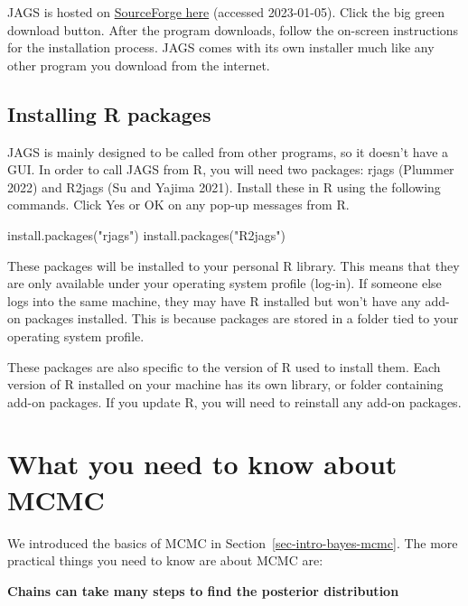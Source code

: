 \documentclass[
  13,
  letterpaper,
]{report}
\newenvironment{Shaded}{\begin{snugshade}}{\end{snugshade}}
\newcommand{\FunctionTok}[1]{\textcolor[rgb]{0.28,0.35,0.67}{#1}}
\newcommand{\NormalTok}[1]{\textcolor[rgb]{0.00,0.23,0.31}{#1}}
\newcommand{\StringTok}[1]{\textcolor[rgb]{0.13,0.47,0.30}{#1}}
\begin{document}
JAGS is hosted on
\href{https://sourceforge.net/projects/mcmc-jags/}{SourceForge here}
(accessed 2023-01-05). Click the big green download button. After the
program downloads, follow the on-screen instructions for the
installation process. JAGS comes with its own installer much like any
other program you download from the internet.

\subsection{Installing R packages}\label{installing-r-packages}

JAGS is mainly designed to be called from other programs, so it doesn't
have a GUI. In order to call JAGS from R, you will need two packages:
rjags (Plummer 2022) and R2jags (Su and Yajima 2021). Install these in R
using the following commands. Click Yes or OK on any pop-up messages
from R.

\begin{Shaded}
\begin{Highlighting}[]
\FunctionTok{install.packages}\NormalTok{(}\StringTok{"rjags"}\NormalTok{)}
\FunctionTok{install.packages}\NormalTok{(}\StringTok{"R2jags"}\NormalTok{)}
\end{Highlighting}
\end{Shaded}

These packages will be installed to your personal R library. This means
that they are only available under your operating system profile
(log-in). If someone else logs into the same machine, they may have R
installed but won't have any add-on packages installed. This is because
packages are stored in a folder tied to your operating system profile.

These packages are also specific to the version of R used to install
them. Each version of R installed on your machine has its own library,
or folder containing add-on packages. If you update R, you will need to
reinstall any add-on packages.

\section{What you need to know about
MCMC}\label{what-you-need-to-know-about-mcmc}

We introduced the basics of MCMC in Section~\ref{sec-intro-bayes-mcmc}.
The more practical things you need to know are about MCMC are:

\textbf{Chains can take many steps to find the posterior distribution}
\end{document}
